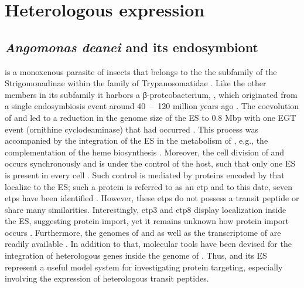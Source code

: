 \section{Heterologous expression}
\subsection{\textit{Angomonas deanei} and its endosymbiont}
 is a monoxenous parasite of insects that belongs to the the subfamily of the Strigomonadinae within the family of Trypanosomatidae \parencite{votypka_kentomonas_2014}. Like the other members in its subfamily it harbors a β-proteobacterium, , which originated from a single endosymbiosis event around 40~--~120 million years ago \parencite{du_monophyletic_1994, teixeira_phylogenetic_2011}. The coevolution of  and  led to a reduction in the genome size of the \gls{ES} to 0.8 Mbp with one \gls{EGT} event (ornithine cyclodeaminase) that had occurred \parencite{alves_endosymbiosis_2013, alves_genome_2013}. This process was accompanied by the integration of the \gls{ES} in the metabolism of , e.g., the complementation of the heme biosynthesis \parencite{klein_biosynthesis_2013}. Moreover, the cell division of  and  occurs synchronously and is under the control of the host, such that only one \gls{ES} is present in every cell \parencite{motta_bacterium_2010, maurya_nucleus-encoded_2025}. Such control is mediated by proteins encoded by  that localize to the \gls{ES}; such a protein is referred to as an \gls{etp} and to this date, seven \gls{etp}s have been identified  \parencite{morales_development_2016, morales_host-symbiont_2023}. However, these \gls{etp}s do not possess a transit peptide or share many similarities. Interestingly, \gls{etp}3 and \gls{etp}8 display localization inside the \gls{ES}, suggesting protein import, yet it remains unknown how protein import occurs \parencite{morales_host-symbiont_2023}. Furthermore, the genomes of  and  as well as the transcriptome of  are readily available \parencite{morales_development_2016, motta_predicting_2013,alves_genome_2013}. In addition to that,  molecular tools have been devised for the integration of heterologous genes inside the genome of  \parencite{morales_development_2016}. Thus,  and its \gls{ES} represent a useful model system for investigating protein targeting, especially involving the expression of heterologous transit peptides. 

